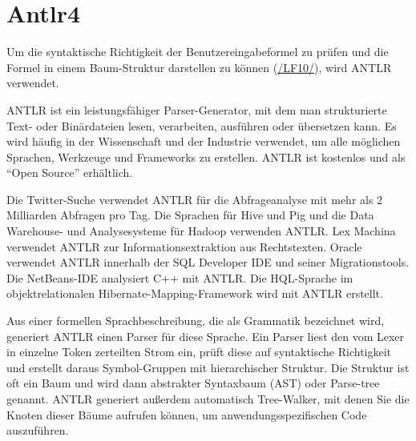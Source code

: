 \section{Antlr4}\label{sec:Antlr4}
Um die syntaktische Richtigkeit der Benutzereingabeformel zu prüfen und die Formel in einem Baum-Struktur darstellen zu können (\hyperlink{/LF10/}{/LF10/}), wird ANTLR verwendet.

ANTLR ist ein leistungsfähiger Parser-Generator, mit dem man strukturierte Text- oder Binärdateien lesen, verarbeiten, ausführen oder übersetzen kann. Es wird häufig in der Wissenschaft und der Industrie verwendet, um alle möglichen Sprachen, Werkzeuge und Frameworks zu erstellen. ANTLR ist kostenlos und als ``Open Source'' erhältlich.

Die Twitter-Suche verwendet ANTLR für die Abfrageanalyse mit mehr als 2 Milliarden Abfragen pro Tag. Die Sprachen für Hive und Pig und die Data Warehouse- und Analysesysteme für Hadoop verwenden ANTLR. Lex Machina verwendet ANTLR zur Informationsextraktion aus Rechtstexten. Oracle verwendet ANTLR innerhalb der SQL Developer IDE und seiner Migrationstools. Die NetBeans-IDE analysiert C++ mit ANTLR. Die HQL-Sprache im objektrelationalen Hibernate-Mapping-Framework wird mit ANTLR erstellt.\cite{Parr}

Aus einer formellen Sprachbeschreibung, die als Grammatik bezeichnet wird, generiert ANTLR einen Parser für diese Sprache. Ein Parser liest den vom Lexer in einzelne Token zerteilten Strom ein, prüft diese auf syntaktische Richtigkeit und erstellt daraus Symbol-Gruppen mit hierarchischer Struktur. Die Struktur ist oft ein Baum und wird dann abstrakter Syntaxbaum (AST) oder Parse-tree genannt. ANTLR generiert außerdem automatisch Tree-Walker, mit denen Sie die Knoten dieser Bäume aufrufen können, um anwendungsspezifischen Code auszuführen.



